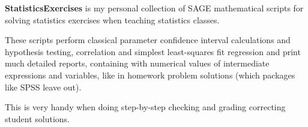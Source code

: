 {\bfseries{Statistics\+Exercises}} is my personal collection of S\+A\+GE mathematical scripts for solving statistics exercises when teaching statistics classes.

These scripts perform classical parameter confidence interval calculations and hypothesis testing, correlation and simplest least-\/squares fit regression and print much detailed reports, containing with numerical values of intermediate expressions and variables, like in homework problem solutions (which packages like S\+P\+SS leave out).

This is very handy when doing step-\/by-\/step checking and grading correcting student solutions. 